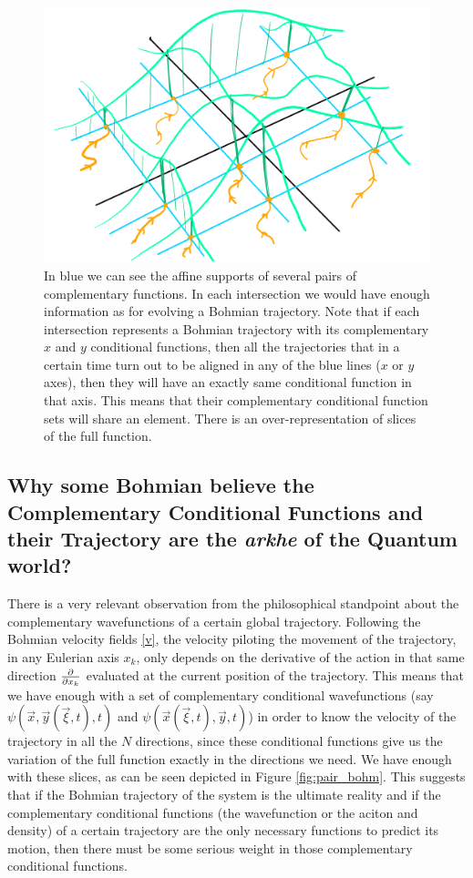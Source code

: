 \documentclass[11pt, a4paper]{article} %
\begin{document}
\begin{figure}[h!]
  \centering
    \includegraphics[width=0.65\linewidth]{many_bohmian.png}
  \caption{In blue we can see the affine supports of several pairs of complementary functions. In each intersection we would have enough information as for evolving a Bohmian trajectory. Note that if each intersection represents a Bohmian trajectory with its complementary $x$ and $y$ conditional functions, then all the trajectories that in a certain time turn out to be aligned in any of the blue lines ($x$ or $y$ axes), then they will have an exactly same conditional function in that axis. This means that their complementary conditional function sets will share an element. There is an over-representation of slices of the full function. }
  \label{fig:over}
\end{figure}
\newpage
\subsection*{Why some Bohmian believe the Complementary Conditional Functions and their Trajectory are the {\em arkhe} of the Quantum world?}
There is a very relevant observation from the philosophical standpoint about the complementary wavefunctions of a certain global trajectory. Following the Bohmian velocity fields \eqref{v}, the velocity piloting the movement of the trajectory, in any Eulerian axis $x_k$, only depends on the derivative of the action in that same direction $\pdv{}{x_k}$ evaluated at the current position of the trajectory. This means that we have enough with a set of complementary conditional wavefunctions (say $\psi(\vec{x},\vec{y}(\vec{\xi},t),t)$ and $\psi(\vec{x}(\vec{\xi},t),\vec{y},t)$) in order to know the velocity of the trajectory in all the $N$ directions, since these conditional functions give us the variation of the full function exactly in the directions we need. We have enough with these slices, as can be seen depicted in Figure \ref{fig:pair_bohm}. This suggests that if the Bohmian trajectory of the system is the ultimate reality and if the complementary conditional functions (the wavefunction or the aciton and density) of a certain trajectory are the only necessary functions to predict its motion, then there must be some serious weight in those complementary conditional functions. 
\end{document}
